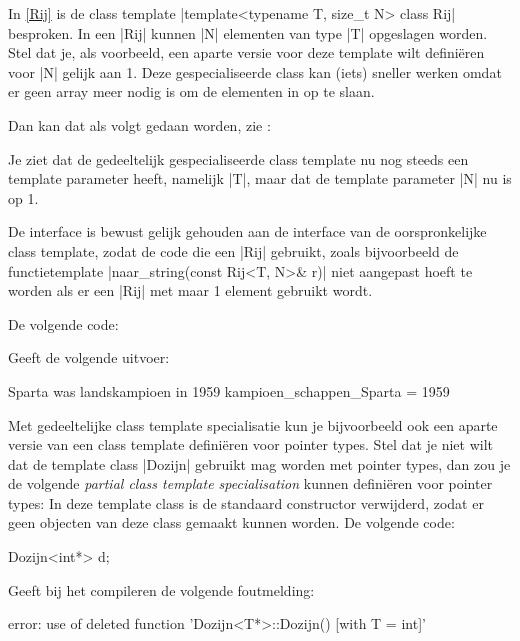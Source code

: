\begin{cpplstShortInline}
In \cref{Rij} is de class template |template<typename T, size_t N> class Rij| besproken.
In een |Rij| kunnen |N| elementen van type |T| opgeslagen worden.
Stel dat je, als voorbeeld, een aparte versie voor deze template wilt definiëren voor |N| gelijk aan 1. Deze gespecialiseerde class kan (iets) sneller werken omdat er geen array meer nodig is om de elementen in op te slaan.

Dan kan dat als volgt gedaan worden, zie :

Je ziet dat de gedeeltelijk gespecialiseerde class template nu nog steeds een template parameter heeft, namelijk |T|, maar dat de template parameter |N| nu  is op 1.

De interface is bewust gelijk gehouden aan de interface van de oorspronkelijke class template, zodat de code die een |Rij| gebruikt, zoals bijvoorbeeld de functietemplate |naar_string(const Rij<T, N>& r)| niet aangepast hoeft te worden als er een |Rij| met maar 1 element gebruikt wordt.

De volgende code:

Geeft de volgende uitvoer:
\begin{coutput}
Sparta was landskampioen in 1959
kampioen_schappen_Sparta = 1959
\end{coutput}

Met gedeeltelijke class template specialisatie kun je bijvoorbeeld ook een aparte versie van een class template definiëren voor pointer types.
Stel dat je niet wilt dat de template class |Dozijn| gebruikt mag worden met pointer types, dan zou je de volgende \emph{partial class template specialisation} kunnen definiëren voor pointer types:
In deze template class is de standaard constructor verwijderd, zodat er geen objecten van deze class gemaakt kunnen worden.
De volgende code:
\begin{cpplstfragment}
	Dozijn<int*> d;
\end{cpplstfragment}

Geeft bij het compileren de volgende foutmelding:
\begin{coutput}
error: use of deleted function 'Dozijn<T*>::Dozijn() [with T = int]'
\end{coutput}


\end{cpplstShortInline}
